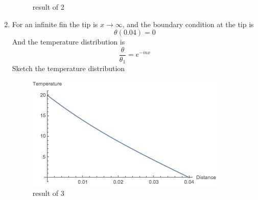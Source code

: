 \begin{solution}
\begin{enumerate}
\begin{figure}[h!]
    \caption{result of 2}
    \label{fig:2:14}
\end{figure}
\item
For an infinite fin the tip is  $x\to\infty$, and the boundary condition at the tip is 
$$\theta(0.04)=0$$
And the temperature distribution is 
$$\frac{\theta}{\theta_1}=e^{-mx}$$
Sketch the temperature distribution
\begin{figure}[h!]
  \centering
    \includegraphics[scale=0.8]{figures/ch2/15}
    \caption{result of 3}
    \label{fig:2:15}
\end{figure}

\end{enumerate}
\end{solution}


